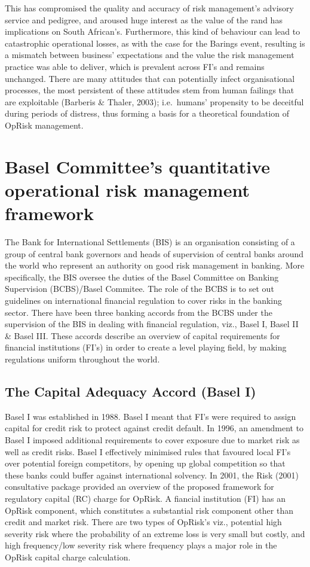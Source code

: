 \documentclass{DissertateUSU}
\begin{document}
This has compromised the quality and accuracy of risk management's
advisory service and pedigree, and aroused huge interest as the value of
the rand has implications on South African's. Furthermore, this kind of
behaviour can lead to catastrophic operational losses, as with the case
for the Barings event, resulting is a mismatch between business'
expectations and the value the risk management practice was able to
deliver, which is prevalent across FI's and remains unchanged. There are
many attitudes that can potentially infect organisational processes, the
most persistent of these attitudes stem from human failings that are
exploitable (Barberis \& Thaler, 2003); i.e.~humans' propensity to be
deceitful during periods of distress, thus forming a basis for a
theoretical foundation of OpRisk management.

\section{Basel Committee's quantitative operational risk management framework}
\label{sec:Basel Committee's quantitative operational risk management framework}

The Bank for International Settlements (BIS) is an organisation
consisting of a group of central bank governors and heads of supervision
of central banks around the world who represent an authority on good
risk management in banking. More specifically, the BIS oversee the
duties of the Basel Committee on Banking Supervision (BCBS)/Basel
Commitee. The role of the BCBS is to set out guidelines on international
financial regulation to cover risks in the banking sector. There have
been three banking accords from the BCBS under the supervision of the
BIS in dealing with financial regulation, viz., Basel I, Basel II \&
Basel III. These accords describe an overview of capital requirements
for financial institutions (FI's) in order to create a level playing
field, by making regulations uniform throughout the world.\medskip 

\subsection{The Capital Adequacy Accord (Basel I)}

Basel I was established in 1988. Basel I meant that FI's were required
to assign capital for credit risk to protect against credit default. In
1996, an amendment to Basel I imposed additional requirements to cover
exposure due to market risk as well as credit risks. Basel I effectively
minimised rules that favoured local FI's over potential foreign
competitors, by opening up global competition so that these banks could
buffer against international solvency. In 2001, the Risk (2001)
consultative package provided an overview of the proposed framework for
regulatory capital (RC) charge for OpRisk. A fiancial institution (FI)
has an OpRisk component, which constitutes a substantial risk component
other than credit and market risk. There are two types of OpRisk's viz.,
potential high severity risk where the probability of an extreme loss is
very small but costly, and high frequency/low severity risk where
frequency plays a major role in the OpRisk capital charge
calculation.\medskip 
\end{document}
